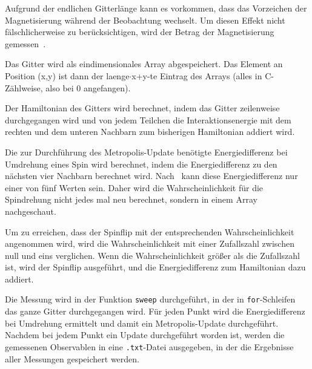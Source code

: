	Aufgrund der endlichen Gitterlänge kann es vorkommen, dass das Vorzeichen der Magnetisierung während der Beobachtung wechselt. Um diesen Effekt nicht fälschlicherweise zu berücksichtigen, wird der Betrag der Magnetisierung gemessen~\cite[vgl. ][S. 106 ff.]{binderheermann}.
	
	
	Das Gitter wird als eindimensionales Array abgespeichert. Das Element an Position (x,y) ist dann der laenge$\cdot$x+y-te Eintrag des Arrays (alles in C-Zählweise, also bei 0 angefangen).

	Der Hamiltonian des Gitters wird berechnet, indem das Gitter zeilenweise durchgegangen wird und von jedem Teilchen die Interaktionsenergie mit dem rechten und dem unteren Nachbarn zum bisherigen Hamiltonian addiert wird.
	
	Die zur Durchführung des Metropolis-Update benötigte Energiedifferenz bei Umdrehung eines Spin wird berechnet, indem die Energiedifferenz zu den nächsten vier Nachbarn berechnet wird. 
	Nach~\cite[S. 103]{binderheermann} kann diese Energiedifferenz nur einer von fünf Werten sein. Daher wird die Wahrscheinlichkeit für die Spindrehung nicht jedes mal neu berechnet, sondern in einem Array nachgeschaut.
	
	Um zu erreichen, dass der Spinflip mit der entsprechenden Wahrscheinlichkeit angenommen wird, wird die Wahrscheinlichkeit mit einer Zufallszahl zwischen null und eins verglichen\cite[nach][]{metropolisupdate}. Wenn die Wahrscheinlichkeit größer als die Zufallszahl ist, wird der Spinflip ausgeführt, und die Energiedifferenz zum Hamiltonian dazu addiert. 
	
	Die Messung wird in der Funktion \texttt{sweep} durchgeführt, in der in \texttt{for}-Schleifen das ganze Gitter durchgegangen wird. Für jeden Punkt wird die Energiedifferenz bei Umdrehung ermittelt und damit ein Metropolis-Update durchgeführt. Nachdem bei jedem Punkt ein Update durchgeführt worden ist, werden die gemessenen Observablen in eine \texttt{.txt}-Datei ausgegeben, in der die Ergebnisse aller Messungen gespeichert werden.
	
